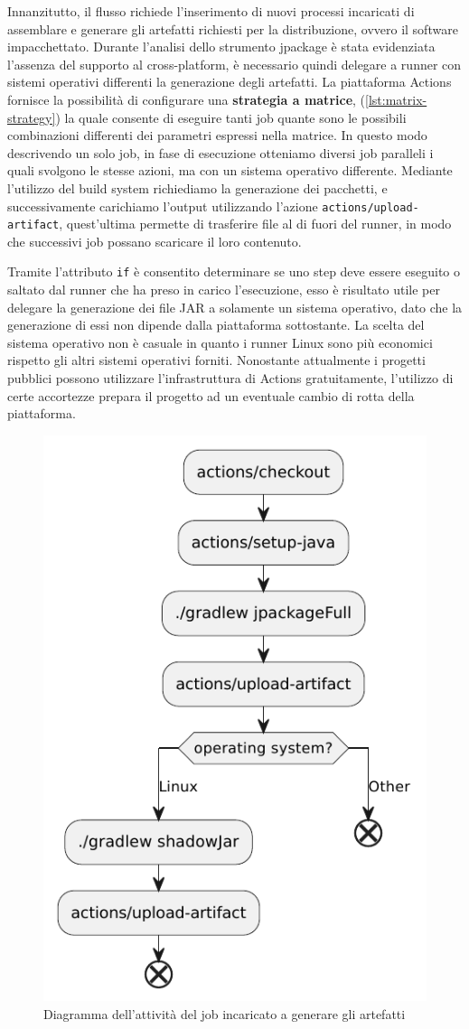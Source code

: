 Innanzitutto, il flusso richiede l'inserimento di nuovi processi incaricati di assemblare e generare gli artefatti richiesti per la distribuzione, ovvero il software impacchettato. Durante l'analisi dello strumento jpackage è stata evidenziata l'assenza del supporto al cross-platform, è necessario quindi delegare a runner con sistemi operativi differenti la generazione degli artefatti. La piattaforma Actions fornisce la possibilità di configurare una \textbf{strategia a matrice}, (\cref{lst:matrix-strategy}) la quale consente di eseguire tanti job quante sono le possibili combinazioni differenti dei parametri espressi nella matrice. In questo modo descrivendo un solo job, in fase di esecuzione otteniamo diversi job paralleli i quali svolgono le stesse azioni, ma con un sistema operativo differente. Mediante l'utilizzo del build system richiediamo la generazione dei pacchetti, e successivamente carichiamo l'output utilizzando l'azione \texttt{actions/upload-artifact}, quest'ultima permette di trasferire file al di fuori del runner, in modo che successivi job possano scaricare il loro contenuto. 



Tramite l'attributo \texttt{if} è consentito determinare se uno step deve essere eseguito o saltato dal runner che ha preso in carico l'esecuzione, esso è risultato utile per delegare la generazione dei file JAR a solamente un sistema operativo, dato che la generazione di essi non dipende dalla piattaforma sottostante. La scelta del sistema operativo non è casuale in quanto i runner Linux sono più economici rispetto gli altri sistemi operativi forniti. Nonostante attualmente i progetti pubblici possono utilizzare l'infrastruttura di Actions gratuitamente, l'utilizzo di certe accortezze prepara il progetto ad un eventuale cambio di rotta della piattaforma.

\begin{figure}[htb]
	\centering
	\includegraphics[width=.5\linewidth]{figures/generate-packages-job.pdf}
	\caption{Diagramma dell'attività del job incaricato a generare gli artefatti}
	\label{fig:generate-packages-job}
\end{figure}

